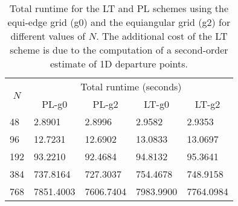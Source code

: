 \begin{table}[!h]
	\begin{tabular}{|l|llll|}
		\hline
		\multicolumn{1}{|c|}{\multirow{2}{*}{\textbf{$N$}}} & \multicolumn{4}{c|}{Total runtime (seconds)}                                                                              \\ \cline{2-5} 
		\multicolumn{1}{|c|}{}                              & \multicolumn{1}{c|}{PL-g0}     & \multicolumn{1}{c|}{PL-g2}     & \multicolumn{1}{c|}{LT-g0}     & \multicolumn{1}{c|}{LT-g2} \\ \hline
		48                                                  & \multicolumn{1}{l|}{2.8901}    & \multicolumn{1}{l|}{2.8996}    & \multicolumn{1}{l|}{2.9582}    & 2.9353                     \\ \hline
		96                                                  & \multicolumn{1}{l|}{12.7231}   & \multicolumn{1}{l|}{12.6902}   & \multicolumn{1}{l|}{13.0833}   & 13.0697                    \\ \hline
		192                                                 & \multicolumn{1}{l|}{93.2210}   & \multicolumn{1}{l|}{92.4684}   & \multicolumn{1}{l|}{94.8132}   & 95.3641                    \\ \hline
		384                                                 & \multicolumn{1}{l|}{737.8164}  & \multicolumn{1}{l|}{727.3037}  & \multicolumn{1}{l|}{754.4678}  & 748.9158                   \\ \hline
		768                                                 & \multicolumn{1}{l|}{7851.4003} & \multicolumn{1}{l|}{7606.7404} & \multicolumn{1}{l|}{7983.9900} & 7764.0984                  \\ \hline
	\end{tabular}
	\caption{Total runtime for the LT and PL schemes using the equi-edge grid (g0) and the equiangular grid (g2) for different values of $N$.
		The additional cost of the LT scheme is due to the computation of a second-order estimate of 1D departure points.}
\label{sw-time}
\end{table}


